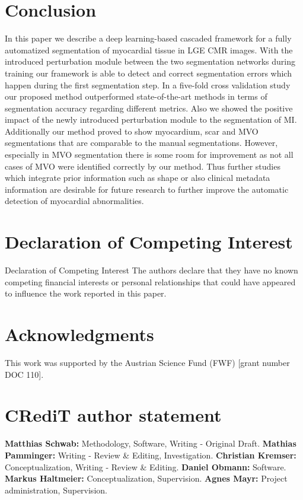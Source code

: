 \documentclass[preprint,5p,authoryear]{elsarticle}
\begin{document}
\section{Conclusion}
\label{sec:conclusion}

In this paper we describe a deep learning-based cascaded framework for a fully automatized segmentation of myocardial tissue in LGE CMR images. With the introduced perturbation module between the two segmentation networks during training our framework is able to detect and correct segmentation errors which happen during the first segmentation step. In a five-fold cross validation study our proposed method outperformed state-of-the-art methods in terms of segmentation accuracy regarding different metrics. Also we showed the positive impact of the newly introduced perturbation module to the segmentation of MI. Additionally our method proved to show myocardium, scar and MVO segmentations that are comparable  to the manual segmentations. However, especially in MVO segmentation there is some room for improvement as not all cases of MVO were identified correctly by our method. Thus further studies which integrate prior information such as shape or also clinical metadata information are desirable for future research to further improve the automatic detection of myocardial abnormalities.

\section*{Declaration of Competing Interest}
Declaration of Competing Interest
The authors declare that they have no known competing financial interests or personal relationships that could have appeared to influence the work reported in this paper.

\section*{Acknowledgments}
This work was supported by the Austrian Science Fund (FWF) [grant number DOC 110].

\section*{CRediT author statement}
\textbf{Matthias Schwab:} Methodology, Software, Writing - Original Draft. \textbf{Mathias Pamminger:} Writing - Review \& Editing, Investigation. \textbf{Christian Kremser:} Conceptualization, Writing - Review \& Editing. \textbf{Daniel Obmann:} Software. \textbf{Markus Haltmeier:} Conceptualization, Supervision. \textbf{Agnes Mayr:} Project administration, Supervision.


 


\end{document}

